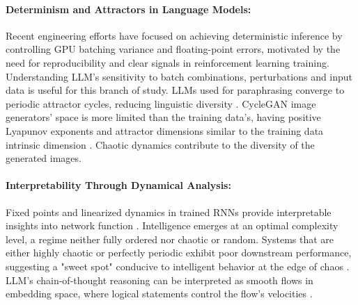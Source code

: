 \documentclass[a4paper,12pt]{article}
\begin{document}
    \paragraph{Determinism and Attractors in Language Models:}
    Recent engineering efforts \cite{he2025nondeterminism} have focused on achieving deterministic inference by controlling GPU batching variance and floating-point errors, motivated by the need for reproducibility and clear signals in reinforcement learning training. Understanding LLM's sensitivity to batch combinations, perturbations and input data is useful for this branch of study.
    LLMs used for paraphrasing converge to periodic attractor cycles, reducing linguistic diversity \cite{wang2025unveiling_attractor_cycles}. CycleGAN image generators' space is more limited than the training data's, having positive Lyapunov exponents and attractor dimensions similar to the training data intrinsic dimension \cite{cyclegan}. Chaotic dynamics contribute to the diversity of the generated images.

    \paragraph{Interpretability Through Dynamical Analysis:}
    \label{par:interpretability_dynamics}
    Fixed points and linearized dynamics in trained RNNs provide interpretable insights into network function \cite{sussillo2013}. Intelligence emerges at an optimal complexity level, a regime neither fully ordered nor chaotic or random. Systems that are either highly chaotic or perfectly periodic exhibit poor downstream performance, suggesting a "sweet spot" conducive to intelligent behavior at the edge of chaos \cite{zhang2024intelligence_edge_of_chaos}. LLM's chain-of-thought reasoning can be interpreted as smooth flows in embedding space, where logical statements control the flow's velocities \cite{zhou2025geometryreasoningflowinglogics}.
\end{document}
